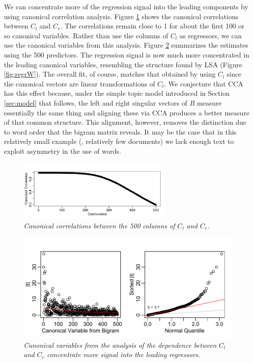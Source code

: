 \documentclass[10pt]{article}
\begin{document}
We can concentrate more of the regression signal into the leading components by using canonical correlation analysis.  Figure \ref{fig:cca} shows the canonical correlations between  $C_l$ and $C_r$.  The correlations remain close to 1 for about the first 100 or so canonical variables.  Rather than use the columns of $C_l$ as regressors, we can use the canonical variables from this analysis.  Figure \ref{fig:regrBcca} summarizes the estimates using the 500 predictors.  The regression signal is now much more concentrated in the leading canonical variables, resembling the structure found by LSA (Figure \ref{fig:regrW}).  The overall fit, of course, matches that obtained by using $C_l$ since the canonical vectors are linear transformations of $C_l$.  We conjecture that CCA has this effect because, under the simple topic model introduced in Section \ref{sec:model} that follows, the left and right singular vectors of $B$ measure essentially the same thing and aligning these via CCA produces a better measure of that common structure.  This alignment, however, removes the distinction due to word order that the bigram matrix reveals.  It may be the case that in this relatively small example (\ie, relatively few documents) we lack enough text to exploit asymmetry in the use of words.
 
 
 \begin{figure}
 \caption{ \label{fig:cca} { \sl Canonical correlations between the 500 columns of $C_l$ and $C_r$.}}

 \centerline{
 \vspace{0.1in}
 \includegraphics[width=3in]{figures/cca}  }
 \vspace{0.2in}
 \end{figure}


 \begin{figure}
 \caption{ \label{fig:regrBcca} { \sl Canonical variables from the analysis of the dependence between $C_l$ and $C_r$ concentrate more signal into the leading regressors.}}

 \centerline{
 \vspace{0.1in}
 \includegraphics[width=5in]{figures/regrBcca}  }
 \vspace{0.2in}
 \end{figure}
\end{document}

